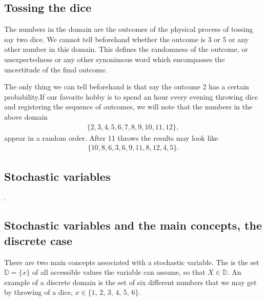\documentclass[letterpaper,10pt,english]{sphinxmanual}
\begin{document}
\subsection{Tossing  the dice}
\label{\detokenize{chapter3:tossing-the-dice}}
The numbers in the domain are the outcomes of the physical process of tossing say two dice.
We cannot tell beforehand whether the outcome is 3 or 5 or any other number in this domain.
This defines the randomness of the outcome, or unexpectedness or any other synonimous word which
encompasses the uncertitude of the final outcome.

The only thing we can tell beforehand
is that say the outcome 2 has a certain probability.If our favorite hobby is to  spend an hour every evening throwing dice and
registering the sequence of outcomes, we will note that the numbers in the above domain
\begin{equation*}
\begin{split}
\{2,3,4,5,6,7,8,9,10,11,12\},
\end{split}
\end{equation*}
appear in a random order. After 11 throws the results may look like
\begin{equation*}
\begin{split}
\{10,8,6,3,6,9,11,8,12,4,5\}.
\end{split}
\end{equation*}

\subsection{Stochastic variables}
\label{\detokenize{chapter3:stochastic-variables}}
.


\subsection{Stochastic variables and the main concepts, the discrete case}
\label{\detokenize{chapter3:stochastic-variables-and-the-main-concepts-the-discrete-case}}
There are two main concepts associated with a stochastic variable. The
 is the set \(\mathbb D = \{x\}\) of all accessible values
the variable can assume, so that \(X \in \mathbb D\). An example of a
discrete domain is the set of six different numbers that we may get by
throwing of a dice, \(x\in\{1,\,2,\,3,\,4,\,5,\,6\}\).
\end{document}
